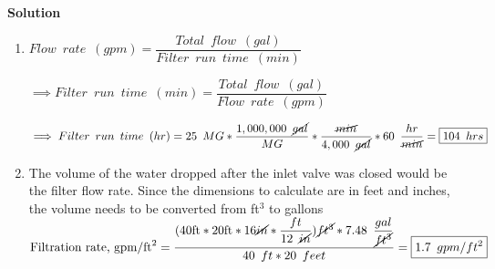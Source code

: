\textbf{Solution}
\begin{enumerate}

\item $Flow \enspace rate \enspace (gpm)=\dfrac{Total \enspace flow \enspace (gal)}{Filter \enspace run \enspace time \enspace (min)}$

\vspace{0.3cm}

$\implies Filter \enspace run \enspace time \enspace (min)=\dfrac{Total \enspace flow \enspace (gal)}{Flow \enspace rate \enspace (gpm)}$\\

\vspace{0.3cm}

$\implies Filter \enspace run \enspace time \enspace (hr)=25 \enspace MG*\dfrac{1,000,000 \enspace \cancel{gal}}{MG}*\dfrac{\cancel{min}}{4,000 \enspace \cancel{gal}}*60 \enspace \dfrac{hr}{\cancel{min}}=\boxed{104 \enspace hrs}$

\item The volume of the water dropped after the inlet valve was closed would be the filter flow rate.  Since the dimensions to calculate are in feet and inches, the volume needs to be converted from ft$^3$ to gallons\\
\vspace{0.2cm}
$\text{Filtration rate, } \mathrm{gpm} / \mathrm{ft}^{2} = 
\dfrac{(
40 \mathrm{ ft}*20 \mathrm{ ft} * 16 \mathrm{\cancel{in}}*
\dfrac{ft}{12 \enspace \cancel{in}}
)
\cancel{ft^3}*7.48 \enspace 
\dfrac
{gal}
{\cancel{ft^3}}}
{40 \enspace ft * 20 \enspace feet}= \boxed{1.7\enspace gpm/ft^2}$\\

\end{enumerate}


